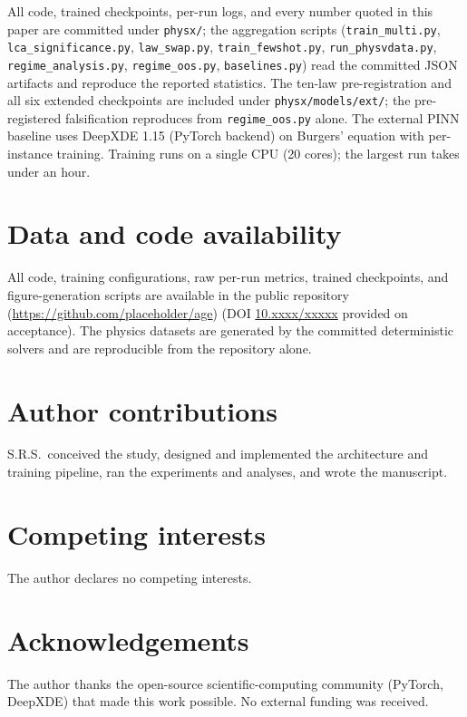 \documentclass[11pt,a4paper]{article}
\begin{document}
All code, trained checkpoints, per-run logs, and every number quoted in this
paper are committed under \texttt{physx/}; the aggregation scripts
(\texttt{train\_multi.py}, \texttt{lca\_significance.py},
\texttt{law\_swap.py}, \texttt{train\_fewshot.py},
\texttt{run\_physvdata.py}, \texttt{regime\_analysis.py},
\texttt{regime\_oos.py}, \texttt{baselines.py}) read the committed
JSON artifacts and reproduce the reported statistics. The ten-law
pre-registration and all six extended checkpoints are included under
\texttt{physx/models/ext/}; the pre-registered falsification reproduces from
\texttt{regime\_oos.py} alone. The external PINN
baseline uses DeepXDE 1.15 (PyTorch backend) on Burgers' equation with
per-instance training. Training runs on a single CPU (20 cores); the largest
run takes under an hour.

\section*{Data and code availability}
\label{sec:dataavail}

All code, training configurations, raw per-run metrics, trained checkpoints,
and figure-generation scripts are available in the public repository
(\url{https://github.com/placeholder/age}) (DOI
\href{https://doi.org/10.xxxx/xxxxx}{10.xxxx/xxxxx} provided on acceptance).
The physics datasets are generated by the committed deterministic solvers and
are reproducible from the repository alone.

\section*{Author contributions}
\label{sec:author}

S.R.S.\ conceived the study, designed and implemented the architecture and
training pipeline, ran the experiments and analyses, and wrote the manuscript.

\section*{Competing interests}
\label{sec:competing}

The author declares no competing interests.

\section*{Acknowledgements}
\label{sec:ack}

The author thanks the open-source scientific-computing community (PyTorch,
DeepXDE) that made this work possible. No external funding was received.
\end{document}
